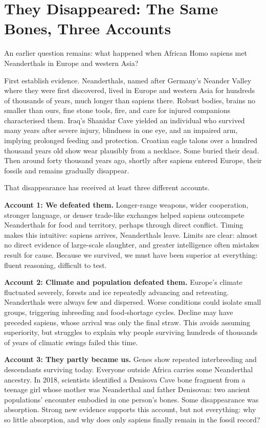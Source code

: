 \section[Their Disappearance: Three Accounts]{They Disappeared: The Same Bones, Three Accounts}
An earlier question remains: what happened when African Homo sapiens met Neanderthals in Europe and western Asia?

First establish evidence. Neanderthals, named after Germany's Neander Valley where they were first discovered, lived in Europe and western Asia for hundreds of thousands of years, much longer than sapiens there. Robust bodies, brains no smaller than ours, fine stone tools, fire, and care for injured companions characterised them. Iraq's Shanidar Cave yielded an individual who survived many years after severe injury, blindness in one eye, and an impaired arm, implying prolonged feeding and protection. Croatian eagle talons over a hundred thousand years old show wear plausibly from a necklace. Some buried their dead. Then around forty thousand years ago, shortly after sapiens entered Europe, their fossils and remains gradually disappear.

That disappearance has received at least three different accounts.

\textbf{Account 1: We defeated them.} Longer-range weapons, wider cooperation, stronger language, or denser trade-like exchanges helped sapiens outcompete Neanderthals for food and territory, perhaps through direct conflict. Timing makes this intuitive: sapiens arrives, Neanderthals leave. Limits are clear: almost no direct evidence of large-scale slaughter, and greater intelligence often mistakes result for cause. Because we survived, we must have been superior at everything: fluent reasoning, difficult to test.

\textbf{Account 2: Climate and population defeated them.} Europe's climate fluctuated severely, forests and ice repeatedly advancing and retreating. Neanderthals were always few and dispersed. Worse conditions could isolate small groups, triggering inbreeding and food-shortage cycles. Decline may have preceded sapiens, whose arrival was only the final straw. This avoids assuming superiority, but struggles to explain why people surviving hundreds of thousands of years of climatic swings failed this time.

\textbf{Account 3: They partly became us.} Genes show repeated interbreeding and descendants surviving today. Everyone outside Africa carries some Neanderthal ancestry. In 2018, scientists identified a Denisova Cave bone fragment from a teenage girl whose mother was Neanderthal and father Denisovan: two ancient populations' encounter embodied in one person's bones. Some disappearance was absorption. Strong new evidence supports this account, but not everything: why so little absorption, and why does only sapiens finally remain in the fossil record?

